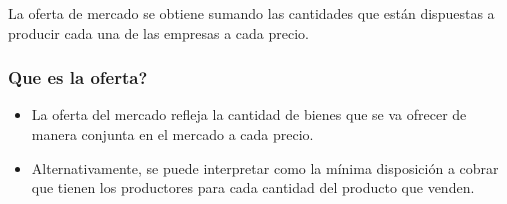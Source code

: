 \documentclass{beamer}
\begin{document}
\begin{frame}
\begin{center}
\end{center}
\centering
La oferta de mercado se obtiene sumando las cantidades que están dispuestas a producir cada una de las empresas a cada precio.
\end{frame}

\begin{frame}
    \frametitle{Qu{e es la oferta?}}
\begin{itemize}
    \item  La oferta del mercado refleja la cantidad de bienes que se va ofrecer de manera conjunta en el mercado a cada precio.
    \item Alternativamente, se puede interpretar como la mínima disposición a cobrar que tienen los productores para cada cantidad del producto que venden.
\end{itemize}

    \begin{center}
    \end{center}
\end{frame}
\end{document}
